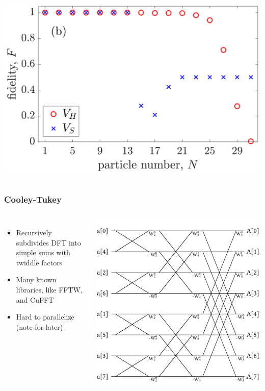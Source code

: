 \documentclass{beamer}
\begin{document}
\begin{frame}
\begin{columns}
\includegraphics[width=\linewidth]{../data/1d/fig7b.png}
\end{columns}

\end{frame}


\begin{frame}
\frametitle{Cooley-Tukey}

\begin{columns}
\begin{itemize}
\item Recursively subdivides DFT into simple sums with twiddle factors
\item Many known libraries, like FFTW, and CuFFT
\item Hard to parallelize (note for later)
\end{itemize}
\includegraphics[width=\textwidth]{radix-8screen.jpg}
\end{columns}
\end{frame}
\end{document}
